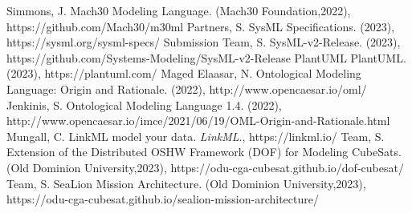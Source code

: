 \begin{thebibliography}{999}
    Simmons, J. Mach30 Modeling Language. (Mach30 Foundation,2022), https://github.com/Mach30/m30ml
    Partners, S. SysML Specifications.  (2023), https://sysml.org/sysml-specs/
    Submission Team, S. SysML-v2-Release.  (2023), https://github.com/Systems-Modeling/SysML-v2-Release
    PlantUML PlantUML.  (2023), https://plantuml.com/
    Maged Elaasar, N. Ontological Modeling Language: Origin and Rationale.  (2022), http://www.opencaesar.io/oml/
    Jenkinis, S. Ontological Modeling Language 1.4.  (2022), http://www.opencaesar.io/imce/2021/06/19/OML-Origin-and-Rationale.html
    Mungall, C. LinkML model your data. {\em LinkML}., https://linkml.io/
    Team, S. Extension of the Distributed OSHW Framework (DOF) for Modeling CubeSats. (Old Dominion University,2023), https://odu-cga-cubesat.github.io/dof-cubesat/
    Team, S. SeaLion Mission Architecture. (Old Dominion University,2023), https://odu-cga-cubesat.github.io/sealion-mission-architecture/
\end{thebibliography}